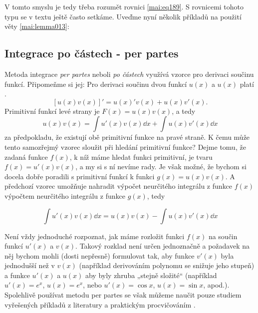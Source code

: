       V tomto smyslu je tedy třeba rozumět rovnici \eqref{mai:eq189}. S rovnicemi tohoto typu se v
      textu ještě často setkáme. Uveďme nyní několik příkladů na použití věty \eqref{mai:lemma013}:
      
    \subsection{Integrace po částech - per partes}\label{mai:IchapVIIsecIIIssecII}
      Metoda integrace \emph{per partes} neboli \emph{po částech} využívá vzorce pro derivaci 
      součinu funkcí. Připomeňme si jej: Pro derivaci součinu dvou funkcí \(u(x)\) a \(u(x)\) platí
      \cite[p.~137]{Musilova2009MA1}.
      \begin{equation}\label{mai:eq101}
        [u(x)v(x)]' = u(x)'v(x) + u(x)v'(x).
      \end{equation} 
      Primitivní funkcí levé strany je \(F(x) = u(x)v(x)\), a tedy
      \begin{equation*}
        u(x)v(x) =  \int u'(x)v(x)\dd{x} + \int u(x)v'(x)\dd{x}
      \end{equation*}  
      za předpokladu, že existují obě primitivní funkce na pravé straně. K čemu může tento
      samozřejmý vzorec sloužit při hledání primitivní funkce? Dejme tomu, že zadaná funkce
      \(f(x)\), k níž máme hledat funkci primitivní, je tvaru \(f(x) = u'(x)v(x)\), a my si s ní
      nevíme rady. Je však možné, že bychom si docela dobře poradili s primitivní funkcí k funkci
      \(g(x) = u(x)v(x)\). A předchozí vzorec umožňuje nahradit výpočet neurčitého integrálu z
      funkce \(f(x)\) výpočtem neurčitého integrálu z funkce \(g(x)\), tedy

      \begin{equation}\label{ma:eq_perpartes}
        \int u'(x)v(x)\dd{x} = u(x)v(x) - \int u(x)v'(x)\dd{x} 
      \end{equation}

      

      Není vždy jednoduché rozpoznat, jak máme rozložit funkci \(f(x)\) na součin funkcí \(u'(x)\) 
      a \(v(x)\). Takový rozklad není určen jednoznačně a požadavek na něj bychom mohli (dosti 
      nepřesně) formulovat tak, aby funkce \(v'(x)\) byla jednodušší než v \(v(x)\) (například 
      derivováním polynomu se snižuje jeho stupeň) a funkce \(u'(x)\) a \(u(x)\) aby byly zhruba 
      „stejně složité“ (například \(u'(x) =e^x\), \(u(x) = e^x\), nebo \(u'(x) = \cos x\), \(u(x) = 
      \sin x\), apod.). Spolehlivě používat metodu per partes se však můžeme naučit pouze studiem 
      vyřešených příkladů z literatury a praktickým procvičováním \cite[p.~138]{Musilova2009MA1}.
  

